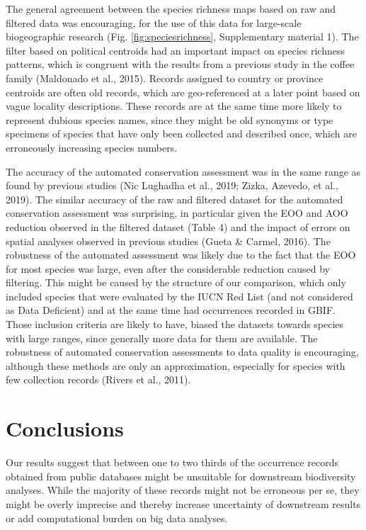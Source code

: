 \documentclass[
  12pt,
]{article}
\begin{document}
The general agreement between the species richness maps based on raw and filtered data was encouraging, for the use of this data for large-scale biogeographic research (Fig. \ref{fig:speciesrichness}, Supplementary material 1). The filter based on political centroids had an important impact on species richness patterns, which is congruent with the results from a previous study in the coffee family (Maldonado et al., 2015). Records assigned to country or province centroids are often old records, which are geo-referenced at a later point based on vague locality descriptions. These records are at the same time more likely to represent dubious species names, since they might be old synonyms or type specimens of species that have only been collected and described once, which are erroneously increasing species numbers.

The accuracy of the automated conservation assessment was in the same range as found by previous studies (Nic Lughadha et al., 2019; Zizka, Azevedo, et al., 2019). The similar accuracy of the raw and filtered dataset for the automated conservation assessment was surprising, in particular given the EOO and AOO reduction observed in the filtered dataset (Table 4) and the impact of errors on spatial analyses observed in previous studies (Gueta \& Carmel, 2016). The robustness of the automated assessment was likely due to the fact that the EOO for most species was large, even after the considerable reduction caused by filtering. This might be caused by the structure of our comparison, which only included species that were evaluated by the IUCN Red List (and not considered as Data Deficient) and at the same time had occurrences recorded in GBIF. Those inclusion criteria are likely to have, biased the datasets towards species with large ranges, since generally more data for them are available. The robustness of automated conservation assessments to data quality is encouraging, although these methods are only an approximation, especially for species with few collection records (Rivers et al., 2011).

\hypertarget{conclusions}{%
\section{Conclusions}\label{conclusions}}

Our results suggest that between one to two thirds of the occurrence records obtained from public databases might be unsuitable for downstream biodiversity analyses. While the majority of these records might not be erroneous per se, they might be overly imprecise and thereby increase uncertainty of downstream results or add computational burden on big data analyses.
\end{document}
